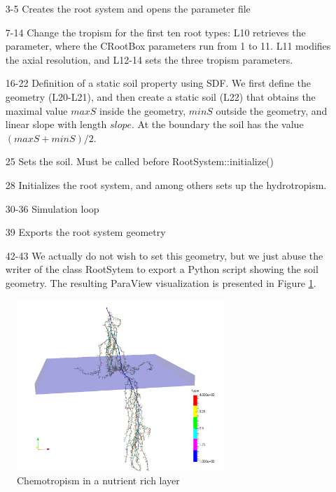 \documentclass[a4paper]{article}
\begin{document}
\begin{itemize}

\item[3-5] Creates the root system and opens the parameter file

\item[7-14] Change the tropism for the first ten root types: L10 retrieves the parameter, where the CRootBox parameters run from 1 to 11. L11 modifies the axial resolution, and L12-14 sets the three tropism parameters. 

\item[16-22] Definition of a static soil property using SDF. We first define the geometry (L20-L21), and then create a static soil (L22) that obtains the maximal value $maxS$ inside the geometry, 
$minS$ outside the geometry, and linear slope with length $slope$. At the boundary the soil has the value $(maxS+minS)/2$.

\item[25] Sets the soil. Must be called before RootSystem::initialize()

\item[28] Initializes the root system, and among others sets up the hydrotropism. 

\item[30-36] Simulation loop

\item[39] Exports the root system geometry

\item[42-43] We actually do not wish to set this geometry, but we just abuse the writer of the class RootSytem to export a Python script showing the soil geometry. The resulting ParaView visualization is presented in Figure \ref{fig:chemo}.

\end{itemize}

\begin{figure}
\centering
\includegraphics[width=0.7\textwidth]{example4a.png}
\caption{Chemotropism in a nutrient rich layer} \label{fig:chemo}
\end{figure}
\end{document}
